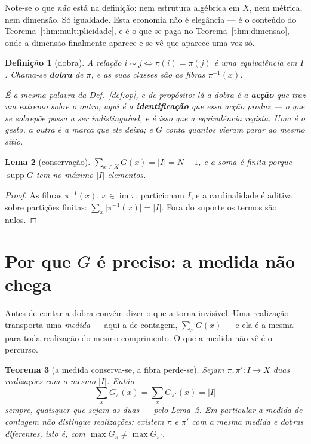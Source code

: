 \documentclass[11pt,a4paper]{article}
\newcommand{\abs}[1]{\lvert #1\rvert}
\newtheorem{teorema}{Teorema}
\newtheorem{lema}[teorema]{Lema}
\newtheorem{definicao}[teorema]{Definição}
\begin{document}
\medskip\noindent Note-se o que \emph{não} está na definição: nem estrutura
algébrica em $X$, nem métrica, nem dimensão. Só igualdade. Esta economia não é
elegância --- é o conteúdo do Teorema~\ref{thm:multiplicidade}, e é o que se paga
no Teorema~\ref{thm:dimensao}, onde a dimensão finalmente aparece e se vê que
aparece uma vez só.

\begin{definicao}[dobra]\label{def:dobra}
A relação $i\sim j \iff \pi(i)=\pi(j)$ é uma equivalência em $I$. Chama-se
\textbf{dobra} de $\pi$, e as suas classes são as fibras $\pi^{-1}(x)$.

\medskip\noindent É a \emph{mesma} palavra da Def.~\ref{def:op}, e de propósito:
lá a dobra é a \textbf{acção} que traz um extremo sobre o outro; aqui é a
\textbf{identificação} que essa acção produz --- o que se sobrepõe passa a ser
indistinguível, e é isso que a equivalência regista. Uma é o gesto, a outra é a
marca que ele deixa; e $G$ conta quantos vieram parar ao mesmo sítio.
\end{definicao}

\begin{lema}[conservação]\label{lem:conserva}
$\displaystyle\sum_{x\in X}G(x)=\abs{I}=N+1$, e a soma é finita porque
$\operatorname{supp}G$ tem no máximo $\abs{I}$ elementos.
\end{lema}

\begin{proof}
As fibras $\pi^{-1}(x)$, $x\in\operatorname{im}\pi$, particionam $I$, e a
cardinalidade é aditiva sobre partições finitas:
$\sum_x\lvert\pi^{-1}(x)\rvert=\lvert I\rvert$. Fora do suporte os termos são
nulos.
\end{proof}

\section{Por que $G$ é preciso: a medida não chega}\label{sec:medida}

\noindent Antes de contar a dobra convém dizer o que a torna invisível. Uma
realização transporta uma \emph{medida} --- aqui a de contagem, $\sum_x G(x)$ ---
e ela é a mesma para toda realização do mesmo comprimento. O que a medida não vê
é o percurso.

\begin{teorema}[a medida conserva-se, a fibra perde-se]\label{thm:medida}
Sejam $\pi,\pi'\colon I\to X$ duas realizações com o mesmo $\abs{I}$. Então
\[
\sum_x G_\pi(x)=\sum_x G_{\pi'}(x)=\abs{I}
\]
sempre, quaisquer que sejam as duas --- pelo Lema~\ref{lem:conserva}. Em
particular a medida de contagem não distingue realizações: existem $\pi$ e
$\pi'$ com a mesma medida e dobras diferentes, isto é, com
$\max G_\pi\neq\max G_{\pi'}$.
\end{teorema}
\end{document}

